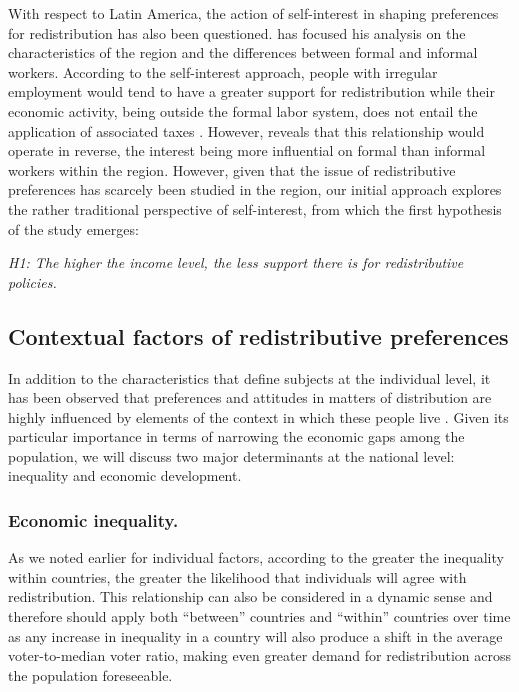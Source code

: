 \documentclass[utf8]{frontiersSCNS} %
\begin{document}
With respect to Latin America, the action of self-interest in shaping preferences for redistribution has also been questioned. \textcite{Berensexclusioncalculatingsolidarity2015} has focused his analysis on the characteristics of the region and the differences between formal and informal workers. According to the self-interest approach, people with irregular employment would tend to have a greater support for redistribution while their economic activity, being outside the formal labor system, does not entail the application of associated taxes \textcite{Schmidt-CatranEconomicinequalitypublic2016}. However, \textcite{Berensexclusioncalculatingsolidarity2015} reveals that this relationship would operate in reverse, the interest being more influential on formal than informal workers within the region. However, given that the issue of redistributive preferences has scarcely been studied in the region, our initial approach explores the rather traditional perspective of self-interest, from which the first hypothesis of the study emerges:

\textit{H1: The higher the income level, the less support there is for redistributive policies.}

\subsection{Contextual factors of redistributive preferences}

In addition to the characteristics that define subjects at the individual level, it has been observed that preferences and attitudes in matters of distribution are highly influenced by elements of the context in which these people live \parencite{WegenerDominantideologiesvariation1995, ForsePerceptioninegaliteseconomiques2007}. Given its particular importance in terms of narrowing the economic gaps among the population, we will discuss two major determinants at the national level: inequality and economic development.

\subsubsection{Economic inequality.}

As we noted earlier for individual factors, according to \textcite{MeltzerRationalTheorySize1981} the greater the inequality within countries, the greater the likelihood that individuals will agree with redistribution. This relationship can also be considered in a dynamic sense and therefore should apply both “between” countries and “within” countries over time as any increase in inequality in a country will also produce a shift in the average voter-to-median voter ratio, making even greater demand for redistribution across the population foreseeable.
\end{document}
